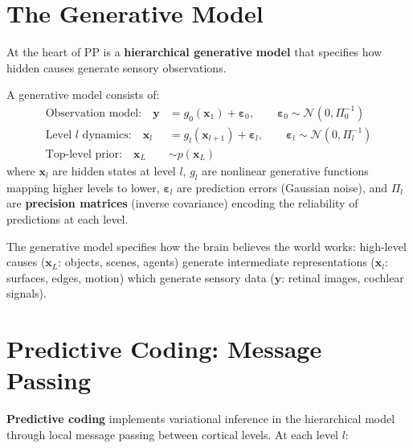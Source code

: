 \documentclass[11pt,a4paper]{report}
\begin{document}
\section{The Generative Model}

At the heart of PP is a \textbf{hierarchical generative model} that specifies how hidden causes generate sensory observations.

\begin{definitionbox}
A generative model consists of:
\begin{align}
  \text{Observation model:}\quad \mathbf{y} &= g_0(\mathbf{x}_1) + \boldsymbol{\varepsilon}_0, \qquad \boldsymbol{\varepsilon}_0 \sim \mathcal{N}(0, \Pi_0^{-1}) \label{eq:obs_model}\\[4pt]
  \text{Level } l \text{ dynamics:}\quad \mathbf{x}_l &= g_l(\mathbf{x}_{l+1}) + \boldsymbol{\varepsilon}_l, \qquad \boldsymbol{\varepsilon}_l \sim \mathcal{N}(0, \Pi_l^{-1}) \label{eq:level_l}\\[4pt]
  \text{Top-level prior:}\quad \mathbf{x}_L &\sim p(\mathbf{x}_L) \label{eq:top_prior}
\end{align}
where $\mathbf{x}_l$ are hidden states at level $l$, $g_l$ are nonlinear generative functions mapping higher levels to lower, $\boldsymbol{\varepsilon}_l$ are prediction errors (Gaussian noise), and $\Pi_l$ are \textbf{precision matrices} (inverse covariance) encoding the reliability of predictions at each level.
\end{definitionbox}

The generative model specifies how the brain believes the world works: high-level causes ($\mathbf{x}_L$: objects, scenes, agents) generate intermediate representations ($\mathbf{x}_{l}$: surfaces, edges, motion) which generate sensory data ($\mathbf{y}$: retinal images, cochlear signals).

\section{Predictive Coding: Message Passing}

\textbf{Predictive coding} implements variational inference in the hierarchical model through local message passing between cortical levels. At each level $l$:
\end{document}
